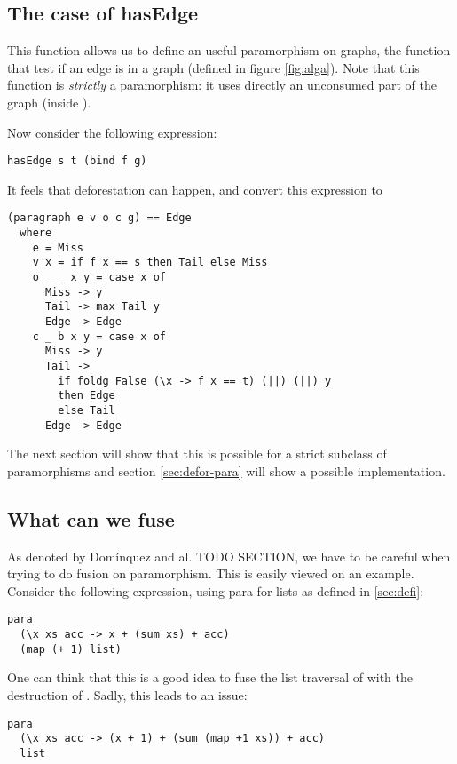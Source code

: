 \subsection{The case of hasEdge}
This function allows us to define an useful paramorphism on graphs, the  function that test if an edge is in a graph (defined in figure \ref{fig:alga}). Note that this function is \emph{strictly} a paramorphism: it uses directly an unconsumed part of the graph (inside ).

Now consider the following expression:
\begin{verbatim}
hasEdge s t (bind f g)
\end{verbatim}

It feels that deforestation can happen, and convert this expression to
\begin{verbatim}
(paragraph e v o c g) == Edge
  where
    e = Miss
    v x = if f x == s then Tail else Miss
    o _ _ x y = case x of
      Miss -> y
      Tail -> max Tail y
      Edge -> Edge
    c _ b x y = case x of
      Miss -> y
      Tail ->
        if foldg False (\x -> f x == t) (||) (||) y
        then Edge
        else Tail
      Edge -> Edge
\end{verbatim}

The next section will show that this is possible for a strict subclass of paramorphisms and section \ref{sec:defor-para} will show a possible implementation.

\subsection{What can we fuse}

As denoted by Domínquez and al. \cite{paramorphismFusion} TODO SECTION, we have to be careful when trying to do fusion on paramorphism.
This is easily viewed on an example. Consider the following expression, using para for lists as defined in \ref{sec:defi}:
\begin{verbatim}
para
  (\x xs acc -> x + (sum xs) + acc)
  (map (+ 1) list)
\end{verbatim}

One can think that this is a good idea to fuse the list traversal of  with the destruction of . Sadly, this leads to an issue:

\begin{verbatim}
para
  (\x xs acc -> (x + 1) + (sum (map +1 xs)) + acc)
  list
\end{verbatim}

